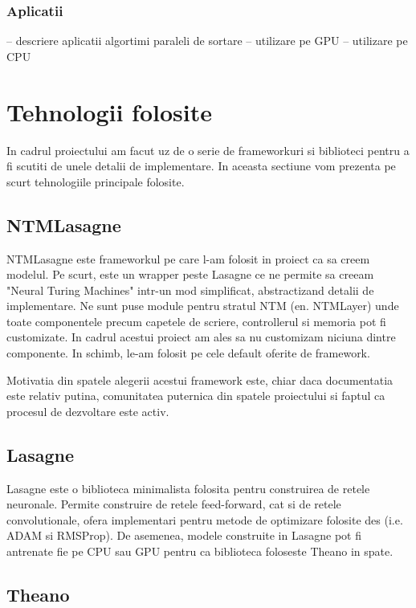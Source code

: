 \documentclass[12pt]{article}
\begin{document}
\subsubsection{Aplicatii}

-- descriere aplicatii algortimi paraleli de sortare
-- utilizare pe GPU
-- utilizare pe CPU

\section{Tehnologii folosite}

In cadrul proiectului am facut uz de o serie de frameworkuri si biblioteci pentru a fi scutiti de unele detalii de implementare. In aceasta sectiune vom prezenta pe scurt tehnologiile principale folosite.

\subsection{NTMLasagne}

NTMLasagne este frameworkul pe care l-am folosit in proiect ca sa creem modelul. Pe scurt, este un wrapper peste Lasagne  ce ne permite sa creeam "Neural Turing Machines" intr-un mod simplificat, abstractizand detalii de implementare. Ne sunt puse module pentru stratul NTM (en. NTMLayer) unde toate componentele precum capetele de scriere, controllerul si memoria pot fi customizate. In cadrul acestui proiect am ales sa nu customizam niciuna dintre componente. In schimb, le-am folosit pe cele default oferite de framework.

Motivatia din spatele alegerii acestui framework este, chiar daca documentatia este relativ putina, comunitatea puternica din spatele proiectului si faptul ca procesul de dezvoltare este activ.


\subsection{Lasagne}

Lasagne este o biblioteca minimalista folosita pentru construirea de retele neuronale. Permite construire de retele feed-forward, cat si de retele convolutionale, ofera implementari pentru metode de optimizare folosite des (i.e. ADAM si RMSProp). De asemenea, modele construite in Lasagne pot fi antrenate fie pe CPU sau GPU pentru ca biblioteca foloseste Theano in spate.


\subsection{Theano}
\end{document}
